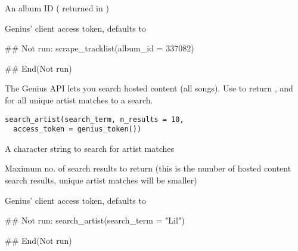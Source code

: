 \documentclass[a4paper]{book}
\begin{document}
%
\begin{Arguments}
\begin{ldescription}
\item[\code{album\_id}] An album ID ( returned in )

\item[\code{access\_token}] Genius' client access token, defaults to 
\end{ldescription}
\end{Arguments}
%
\begin{Examples}
\begin{ExampleCode}
## Not run: 
scrape_tracklist(album_id = 337082)

## End(Not run)
\end{ExampleCode}
\end{Examples}
%
\begin{Description}\relax
The Genius API lets you search hosted content (all songs). Use  to
return ,  and  for all unique artist matches to a search.
\end{Description}
%
\begin{Usage}
\begin{verbatim}
search_artist(search_term, n_results = 10,
  access_token = genius_token())
\end{verbatim}
\end{Usage}
%
\begin{Arguments}
\begin{ldescription}
\item[\code{search\_term}] A character string to search for artist matches

\item[\code{n\_results}] Maximum no. of search results to return (this is the number of hosted content search results, unique artist matches will be smaller)

\item[\code{access\_token}] Genius' client access token, defaults to 
\end{ldescription}
\end{Arguments}
%
\begin{Examples}
\begin{ExampleCode}
## Not run: 
search_artist(search_term = "Lil")

## End(Not run)
\end{ExampleCode}
\end{Examples}
\end{document}
